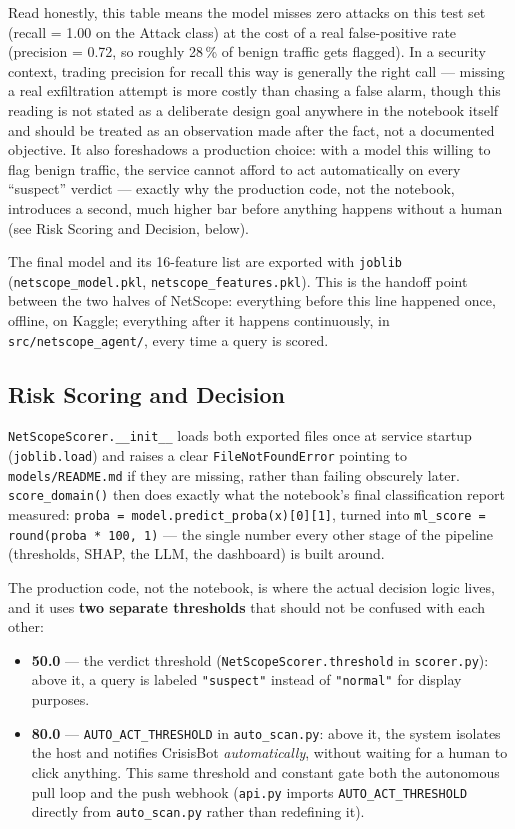 \documentclass[12pt,a4paper]{report}
\begin{document}
Read honestly, this table means the model misses zero attacks on this test set (recall = 1.00 on the Attack class) at the cost of a real false-positive rate (precision = 0.72, so roughly 28\,\% of benign traffic gets flagged). In a security context, trading precision for recall this way is generally the right call --- missing a real exfiltration attempt is more costly than chasing a false alarm, though this reading is not stated as a deliberate design goal anywhere in the notebook itself and should be treated as an observation made after the fact, not a documented objective. It also foreshadows a production choice: with a model this willing to flag benign traffic, the service cannot afford to act automatically on every ``suspect'' verdict --- exactly why the production code, not the notebook, introduces a second, much higher bar before anything happens without a human (see Risk Scoring and Decision, below).

The final model and its 16-feature list are exported with \texttt{joblib} (\texttt{netscope\_model.pkl}, \texttt{netscope\_features.pkl}). This is the handoff point between the two halves of NetScope: everything before this line happened once, offline, on Kaggle; everything after it happens continuously, in \texttt{src/netscope\_agent/}, every time a query is scored.

\subsection*{Risk Scoring and Decision}
\texttt{NetScopeScorer.\_\_init\_\_} loads both exported files once at service startup (\texttt{joblib.load}) and raises a clear \texttt{FileNotFoundError} pointing to \texttt{models/README.md} if they are missing, rather than failing obscurely later. \texttt{score\_domain()} then does exactly what the notebook's final classification report measured: \texttt{proba = model.predict\_proba(x)[0][1]}, turned into \texttt{ml\_score = round(proba * 100, 1)} --- the single number every other stage of the pipeline (thresholds, SHAP, the LLM, the dashboard) is built around.

The production code, not the notebook, is where the actual decision logic lives, and it uses \textbf{two separate thresholds} that should not be confused with each other:

\begin{itemize}[nosep]
\item \textbf{50.0} --- the verdict threshold (\texttt{NetScopeScorer.threshold} in \texttt{scorer.py}): above it, a query is labeled \texttt{"suspect"} instead of \texttt{"normal"} for display purposes.
\item \textbf{80.0} --- \texttt{AUTO\_ACT\_THRESHOLD} in \texttt{auto\_scan.py}: above it, the system isolates the host and notifies CrisisBot \emph{automatically}, without waiting for a human to click anything. This same threshold and constant gate both the autonomous pull loop and the push webhook (\texttt{api.py} imports \texttt{AUTO\_ACT\_THRESHOLD} directly from \texttt{auto\_scan.py} rather than redefining it).
\end{itemize}
\end{document}
